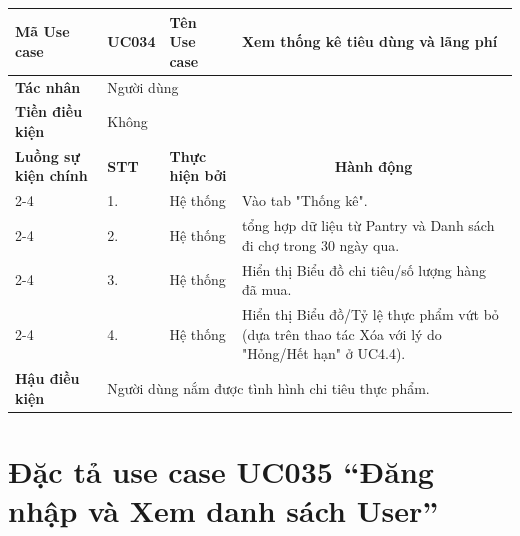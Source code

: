 \begin{longtable}{|p{2.7cm}|p{0.8cm}|p{2.6cm}|p{7.3cm}|}
\hline
\cellcolor[HTML]{D5F5E3}\textbf{Mã Use case} & \multicolumn{1}{l|}{UC034} & \cellcolor[HTML]{D5F5E3}\textbf{Tên Use case} & Xem thống kê tiêu dùng và lãng phí \\ \hline
\cellcolor[HTML]{D5F5E3}\textbf{Tác nhân} & \multicolumn{3}{p{10.7cm}|}{Người dùng} \\ \hline
\cellcolor[HTML]{D5F5E3}\textbf{Tiền điều kiện} & \multicolumn{3}{p{10.7cm}|}{Không} \\ \hline

\cellcolor[HTML]{D5F5E3}\textbf{Luồng sự kiện chính} & \cellcolor[HTML]{FDEBD0}\textbf{STT} & \cellcolor[HTML]{FDEBD0}\textbf{Thực hiện bởi} & \multicolumn{1}{c|}{\cellcolor[HTML]{FDEBD0}\textbf{Hành động}} \\ \cline{2-4} 
\cellcolor[HTML]{D5F5E3} & 1. & Hệ thống & Vào tab "Thống kê". \\ \cline{2-4} 
\cellcolor[HTML]{D5F5E3} & 2. & Hệ thống & tổng hợp dữ liệu từ Pantry và Danh sách đi chợ trong 30 ngày qua. \\ \cline{2-4} 
\cellcolor[HTML]{D5F5E3} & 3. & Hệ thống & Hiển thị Biểu đồ chi tiêu/số lượng hàng đã mua. \\ \cline{2-4} 
\cellcolor[HTML]{D5F5E3} & 4. & Hệ thống & Hiển thị Biểu đồ/Tỷ lệ thực phẩm vứt bỏ (dựa trên thao tác Xóa với lý do "Hỏng/Hết hạn" ở UC4.4). \\ \hline

\cellcolor[HTML]{D5F5E3}\textbf{Hậu điều kiện} & \multicolumn{3}{p{10.7cm}|}{Người dùng nắm được tình hình chi tiêu thực phẩm.} \\ \hline
\end{longtable}
\endgroup

\section{Đặc tả use case UC035 ``Đăng nhập và Xem danh sách User''}
\vspace{0.5cm}

\begingroup
\renewcommand{\arraystretch}{1.5}

